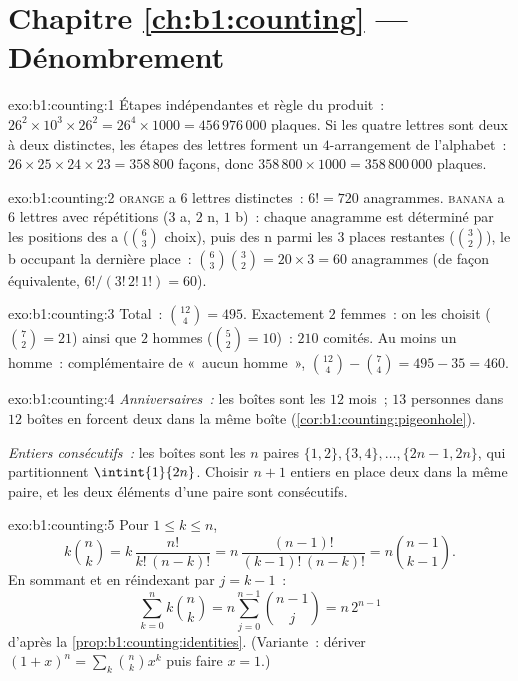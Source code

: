 \section*{Chapitre \ref{ch:b1:counting} --- Dénombrement}

\begin{solution}{exo:b1:counting:1}
Étapes indépendantes et règle du produit~: $26^2 \times 10^3 \times 26^2
= 26^4 \times 1000 = 456\,976\,000$ plaques. Si les quatre lettres sont
deux à deux distinctes, les étapes des lettres forment un
$4$-arrangement de l'alphabet~: $26 \times 25 \times 24 \times 23 =
358\,800$ façons, donc
$358\,800 \times 1000 = 358\,800\,000$ plaques.
\end{solution}

\begin{solution}{exo:b1:counting:2}
\textsc{orange} a $6$ lettres distinctes~: $6! = 720$ anagrammes.
\textsc{banana} a $6$ lettres avec répétitions ($3$ a, $2$ n,
$1$ b)~: chaque anagramme est déterminé par les positions des a
($\binom 63$ choix), puis des n parmi les $3$ places restantes
($\binom 32$), le b occupant la dernière place~:
$\binom{6}{3}\binom{3}{2} = 20 \times 3 = 60$ anagrammes
(de façon équivalente, $6!/(3!\,2!\,1!) = 60$).
\end{solution}

\begin{solution}{exo:b1:counting:3}
Total~: $\binom{12}{4} = 495$. Exactement $2$ femmes~: on les choisit
($\binom 72 = 21$) ainsi que $2$ hommes ($\binom 52 = 10$)~: $210$ comités.
Au moins un homme~: complémentaire de «~aucun homme~»,
$\binom{12}{4} - \binom{7}{4} = 495 - 35 = 460$.
\end{solution}

\begin{solution}{exo:b1:counting:4}
\emph{Anniversaires~:} les boîtes sont les $12$ mois~; $13$ personnes
dans $12$ boîtes en forcent deux dans la même boîte
(\cref{cor:b1:counting:pigeonhole}).

\emph{Entiers consécutifs~:} les boîtes sont les $n$ paires $\{1,2\},
\{3,4\}, \dots, \{2n-1, 2n\}$, qui partitionnent $\intint{1}{2n}$.
Choisir $n + 1$ entiers en place deux dans la même paire, et les deux
éléments d'une paire sont consécutifs.
\end{solution}

\begin{solution}{exo:b1:counting:5}
Pour $1 \leq k \leq n$,
\[
k \binom nk = k\,\frac{n!}{k!\,(n-k)!}
= n\,\frac{(n-1)!}{(k-1)!\,(n-k)!} = n \binom{n-1}{k-1}.
\]
En sommant et en réindexant par $j = k - 1$~:
\[
\sum_{k=0}^{n} k \binom nk = n \sum_{j=0}^{n-1} \binom{n-1}{j}
= n\, 2^{n-1}
\]
d'après la \cref{prop:b1:counting:identities}. (Variante~: dériver
$(1+x)^n = \sum_k \binom nk x^k$ puis faire $x = 1$.)
\end{solution}

